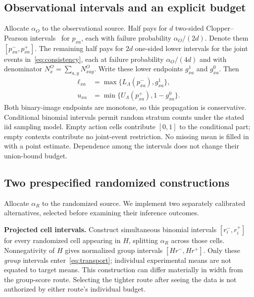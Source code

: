 \documentclass[conference]{IEEEtran}
\begin{document}
\subsection{Observational intervals and an explicit budget}
Allocate $\alpha_O$ to the observational source. Half pays for $d$ two-sided Clopper--Pearson intervals~\cite{clopper1934binomial} for $p_{xa}$, each with failure probability $\alpha_O/(2d)$. Denote them $[p^-_{xa},p^+_{xa}]$. The remaining half pays for $2d$ one-sided lower intervals for the joint events in~\eqref{eq:consistency}, each at failure probability $\alpha_O/(4d)$ and with denominator $N^O_x=\sum_{a,y}N^O_{xay}$. Write these lower endpoints $g^1_{xa}$ and $g^0_{xa}$. Then
\begin{align}
 \ell_{xa}&=\max\{L_\Lambda(p^-_{xa}),g^1_{xa}\},\nonumber\\
 u_{xa}&=\min\{U_\Lambda(p^+_{xa}),1-g^0_{xa}\}.\label{eq:obox}
\end{align}
Both binary-image endpoints are monotone, so this propagation is conservative. Conditional binomial intervals permit random stratum counts under the stated iid sampling model. Empty action cells contribute $[0,1]$ to the conditional part; empty contexts contribute no joint-event restriction. No missing mean is filled in with a point estimate. Dependence among the intervals does not change their union-bound budget.

\subsection{Two prespecified randomized constructions}
Allocate $\alpha_R$ to the randomized source. We implement two separately calibrated alternatives, selected before examining their inference outcomes.

\textbf{Projected cell intervals.} Construct simultaneous binomial intervals $[r^-_i,r^+_i]$ for every randomized cell appearing in $H$, splitting $\alpha_R$ across those cells. Nonnegativity of $H$ gives normalized group intervals $[Hr^-,Hr^+]$. Only these \emph{group} intervals enter~\eqref{eq:transport}; individual experimental means are not equated to target means. This construction can differ materially in width from the group-score route. Selecting the tighter route after seeing the data is not authorized by either route's individual budget.
\end{document}
